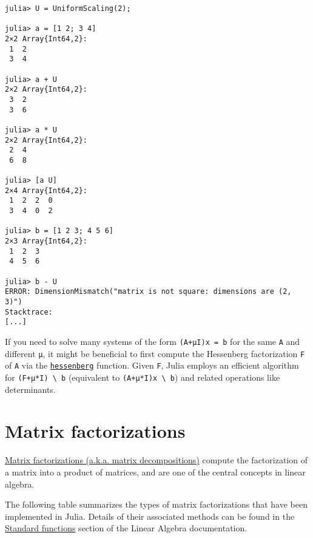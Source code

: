 \begin{verbatim}
julia> U = UniformScaling(2);

julia> a = [1 2; 3 4]
2×2 Array{Int64,2}:
 1  2
 3  4

julia> a + U
2×2 Array{Int64,2}:
 3  2
 3  6

julia> a * U
2×2 Array{Int64,2}:
 2  4
 6  8

julia> [a U]
2×4 Array{Int64,2}:
 1  2  2  0
 3  4  0  2

julia> b = [1 2 3; 4 5 6]
2×3 Array{Int64,2}:
 1  2  3
 4  5  6

julia> b - U
ERROR: DimensionMismatch("matrix is not square: dimensions are (2, 3)")
Stacktrace:
[...]
\end{verbatim}



If you need to solve many systems of the form \texttt{(A+μI)x = b} for the same \texttt{A} and different \texttt{μ}, it might be beneficial to first compute the Hessenberg factorization \texttt{F} of \texttt{A} via the \hyperlink{14451165250498024497}{\texttt{hessenberg}} function. Given \texttt{F}, Julia employs an efficient algorithm for \texttt{(F+μ*I) {\textbackslash} b} (equivalent to \texttt{(A+μ*I)x {\textbackslash} b}) and related operations like determinants.



\hypertarget{12615392115882150758}{}


\section{Matrix factorizations}



\href{https://en.wikipedia.org/wiki/Matrix\_decomposition}{Matrix factorizations (a.k.a. matrix decompositions)} compute the factorization of a matrix into a product of matrices, and are one of the central concepts in linear algebra.



The following table summarizes the types of matrix factorizations that have been implemented in Julia. Details of their associated methods can be found in the \hyperlink{14873423929127000343}{Standard functions} section of the Linear Algebra documentation.




